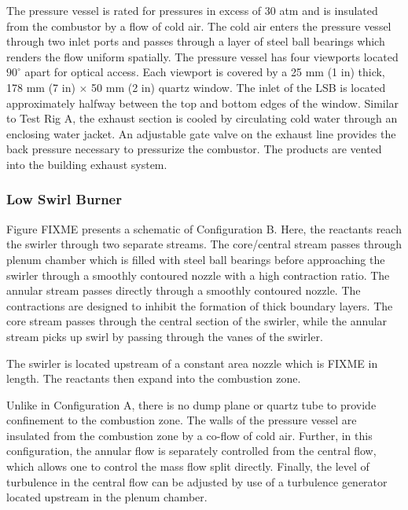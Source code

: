The pressure vessel is rated for pressures in excess of 30 atm and is insulated from the combustor by a flow of cold air.
The cold air enters the pressure vessel through two inlet ports and passes through a layer of steel ball bearings which renders the flow uniform spatially.
The pressure vessel has four viewports located \(90^\circ\) apart for optical access.
Each viewport is covered by a 25 mm (1 in) thick, 178 mm (7 in) \(\times\) 50 mm (2 in) quartz window.
The inlet of the LSB is located approximately halfway between the top and bottom edges of the window.
Similar to Test Rig A, the exhaust section is cooled by circulating cold water through an enclosing water jacket.
An adjustable gate valve on the exhaust line provides the back pressure necessary to pressurize the combustor.
The products are vented into the building exhaust system.

\subsubsection{Low Swirl Burner}

Figure FIXME presents a schematic of Configuration B.
Here, the reactants reach the swirler through two separate streams.
The core/central stream passes through plenum chamber which is filled with steel ball bearings before approaching the swirler through a smoothly contoured nozzle with a high contraction ratio.
The annular stream passes directly through a smoothly contoured nozzle.
The contractions are designed to inhibit the formation of thick boundary layers.
The core stream passes through the central section of the swirler, while the annular stream picks up swirl by passing through the vanes of the swirler.

The swirler is located upstream of a constant area nozzle which is FIXME in length.
The reactants then expand into the combustion zone.

Unlike in Configuration A, there is no dump plane or quartz tube to provide confinement to the combustion zone.
The walls of the pressure vessel are insulated from the combustion zone by a co-flow of cold air.
Further, in this configuration, the annular flow is separately controlled from the central flow, which allows one to control the mass flow split directly.
Finally, the level of turbulence in the central flow can be adjusted by use of a turbulence generator\cite{2011-marshall} located upstream in the plenum chamber.

